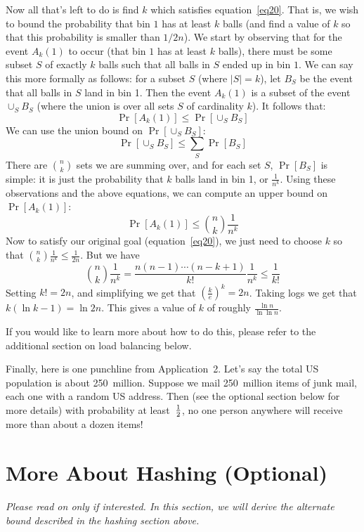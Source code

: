 \documentclass[11pt]{article}
\def\half{{\textstyle{1\over 2}}}
\begin{document}
Now all that's left to do is find $k$ which satisfies equation~\ref{eq20}. 
That is, we wish to bound the probability that bin $1$ has at least $k$ balls 
(and find a value of $k$ so that this probability is smaller than $1/2n$). 
We start by observing that for the event $A_k(1)$ to occur (that bin $1$ has 
at least $k$ balls), there must be some subset $S$ of exactly $k$ balls such 
that all balls in $S$ ended up in bin $1$. We can say this more formally as follows:
for a subset $S$ (where $|S| = k$), let $B_S$ be the event that
all balls in $S$ land in bin 1. Then 
the event $A_k(1)$ is a subset of the event $\cup_{S} B_S$ (where the union is over
all sets $S$ of cardinality $k$). It follows that: 
$$
\Pr[A_k(1)] \leq \Pr[\cup_{S} B_S]
$$
We can use the union bound on $\Pr[\cup_S B_S]$:
$$
\Pr[\cup_S B_S] \leq \sum\limits_S \Pr[B_S]
$$
There are ${n\choose k}$ sets we are summing over, and for each set $S$, $\Pr[B_S]$ is simple: it is just 
the probability that $k$ balls land in bin 1, or $\frac{1}{n^k}$. Using these observations
and the above equations, we can compute
an upper bound on $\Pr[A_k(1)]$:
$$
\Pr[A_k(1)]\leq {n\choose k}\frac{1}{n^k}
$$
Now to satisfy our original goal (equation~\ref{eq20}), we just need to choose $k$
so that ${n\choose k}\frac{1}{n^k}\leq\frac{1}{2n}$. But we have 
$${n\choose k}\frac{1}{n^k} = \frac{n(n-1)\cdots (n-k+1)}{k!}\frac{1}{n^k} \leq \frac{1}{k!}$$ 
Setting $k! = 2n$, and simplifying we get that $\left ( \frac{k}{e} \right )^k = 2n$.
Taking logs we get that $k(\ln k - 1) = \ln 2n$. This gives a value of $k$ of roughly $\frac{\ln n}{\ln \ln n}$. 

If you would like to learn more about how to do 
this, please refer to the additional section on load balancing below.

Finally, here is one punchline from Application~2.  Let's say the total
US population is about 250~million.  Suppose we mail 250~million items
of junk mail, each one with a random US address.  Then (see the optional section below for more details)
with probability at least~$\half$, no one person anywhere will receive
more than about a dozen items!




\section*{More About Hashing (Optional)}
\textit{Please read on only if interested. In this section, we will derive the alternate bound described in the hashing section above.}
\end{document}
